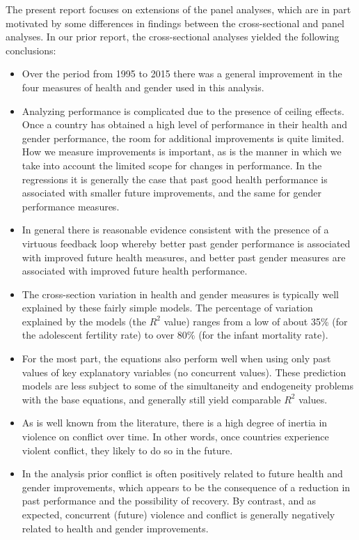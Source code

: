 \documentclass[12pt]{article}
\begin{document}
The present report focuses on extensions of the panel analyses, which are in part motivated by some differences in findings between the cross-sectional and panel analyses. In our prior report, the cross-sectional analyses yielded the following conclusions:
\begin{itemize}
\item Over the period from 1995 to 2015 there was a general improvement in the four measures of health and gender used in this analysis.
\item Analyzing performance is complicated due to the presence of ceiling effects. Once a country has obtained a high level of performance in their health and gender performance, the room for additional improvements is quite limited. How we measure improvements is important, as is the manner in which we take into account the limited scope for changes in performance. In the regressions it is generally the case that past good health performance is associated with smaller future improvements, and the same for gender performance measures.
\item In general there is reasonable evidence consistent with the presence of a virtuous feedback loop whereby better past gender performance is associated with improved future health measures, and better past gender measures are associated with improved future health performance.
\item The cross-section variation in health and gender measures is typically well explained by these fairly simple models. The percentage of variation explained by the models (the $R^2$ value) ranges from a low of about 35\% (for the adolescent fertility rate) to over 80\% (for the infant mortality rate).
\item For the most part, the equations also perform well when using only past values of key explanatory variables (no concurrent values). These prediction models are less subject to some of the simultaneity and endogeneity problems with the base equations, and generally still yield comparable $R^2$ values.
\item As is well known from the literature, there is a high degree of inertia in violence on conflict over time. In other words, once countries experience violent conflict, they likely to do so in the future.
\item In the analysis prior conflict is often positively related to future health and gender improvements, which appears to be the consequence of a reduction in past performance and the possibility of recovery. By contrast, and as expected, concurrent (future) violence and conflict is generally negatively related to health and gender improvements.

\end{itemize}
\end{document}

